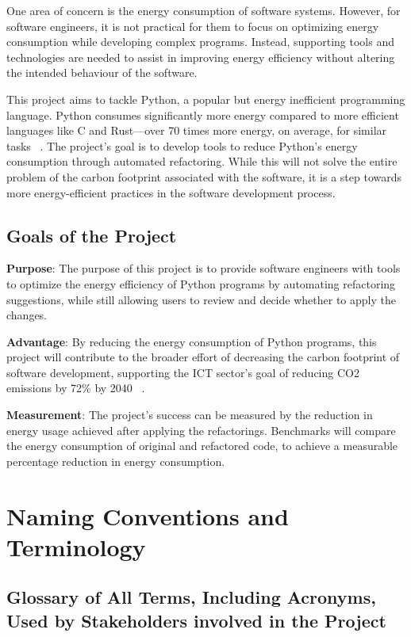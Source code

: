 \documentclass[12pt]{article}
\begin{document}
One area of concern is the energy consumption of software systems.
However, for software engineers, it is not practical for them to
focus on optimizing energy consumption while developing complex
programs. Instead, supporting tools and technologies are needed to
assist in improving energy efficiency without altering the intended
behaviour of the software.

This project aims to tackle Python, a popular but energy inefficient
programming language. Python consumes significantly more energy
compared to more efficient languages like C and Rust—over 70 times
more energy, on average, for similar tasks ~\citep{PereiraEtAl2017}.
The project's goal is to develop tools to reduce Python's energy
consumption through automated refactoring. While this will not solve
the entire problem of the carbon footprint associated with the
software, it is a step towards more energy-efficient practices in the
software development process.

\subsection{Goals of the Project}
\noindent \textbf{Purpose}: The purpose of this project is to provide
software engineers with tools to optimize the energy efficiency of
Python programs by automating refactoring suggestions, while still
allowing users to review and decide whether to apply the changes.

\noindent \textbf{Advantage}: By reducing the energy consumption of
Python programs, this project will contribute to the broader effort
of decreasing the carbon footprint of software development,
supporting the ICT sector's goal of reducing CO2 emissions by 72\% by
2040 ~\citep{FreitagAndBernersLee2021}.

\noindent \textbf{Measurement}: The project's success can be measured
by the reduction in energy usage
achieved after applying the refactorings. Benchmarks will compare the
energy consumption of original
and refactored code, to achieve a measurable percentage reduction in
energy consumption.

\section{Naming Conventions and Terminology}
\subsection{Glossary of All Terms, Including Acronyms, Used by Stakeholders
involved in the Project}
\end{document}
